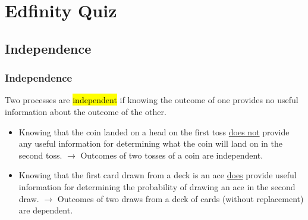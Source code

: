 \documentclass[slidestop,compress,mathserif]{beamer}
\begin{document}

\section{Edfinity Quiz}


\subsection{Independence}


\begin{frame}
\frametitle{Independence}

Two processes are \hl{independent} if knowing the outcome of one provides no useful information about the outcome of the other.

\pause

\begin{itemize}

\item Knowing that the coin landed on a head on the first toss \underline{does not} provide any useful information for determining what the coin will land on in the second toss. $\rightarrow$ Outcomes of two tosses of a coin are independent.

\pause

\item Knowing that the first card drawn from a deck is an ace \underline{does} provide useful information for determining the probability of drawing an ace in the second draw. $\rightarrow$ Outcomes of two draws from a deck of cards (without replacement) are dependent.

\end{itemize}

\end{frame}



\end{document}
